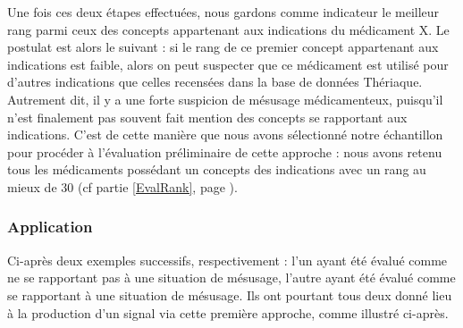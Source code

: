 \documentclass[a4paper, 12pt, openany, oneside, abstract=on]{article} %
\begin{document}
Une fois ces deux étapes effectuées, nous gardons comme indicateur le meilleur rang parmi ceux des concepts appartenant aux indications du médicament X. Le postulat est alors le suivant : si le rang de ce premier concept appartenant aux indications est \og{}faible\fg{}, alors on peut suspecter que ce médicament est utilisé pour d'autres indications que celles recensées dans la base de données Thériaque. Autrement dit, il y a une forte suspicion de mésusage médicamenteux, puisqu'il n'est finalement pas souvent fait mention des concepts se rapportant aux indications. C'est de cette manière que nous avons sélectionné notre échantillon pour procéder à l'évaluation préliminaire de cette approche : nous avons retenu tous les médicaments possédant un concepts des indications avec un rang au mieux de 30 (cf partie \ref{EvalRank}, page \pageref{EvalRank}).

\subsubsection{Application}
Ci-après deux exemples successifs, respectivement : l'un ayant été évalué comme ne se rapportant pas à une situation de mésusage, l'autre ayant été évalué comme se rapportant à une situation de mésusage. Ils ont pourtant tous deux donné lieu à la production d'un signal via cette première approche, comme illustré ci-après.
\end{document}
